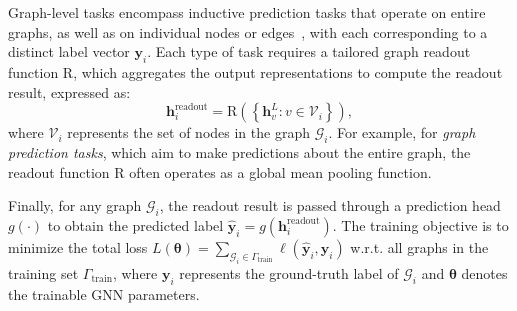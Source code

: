 
Graph-level tasks encompass inductive prediction tasks that operate on entire graphs, as well as on individual nodes or edges~\cite{dwivedi2022long}, with each corresponding to a distinct label vector $\boldsymbol{y}_i$. Each type of task requires a tailored graph readout function $\mathrm{R}$, which aggregates the output representations to compute the readout result, expressed as:
\begin{equation}
\boldsymbol{h}^\text{readout}_i = \mathrm{R}\left( \left\{ \boldsymbol{h}_v^L : v \in \mathcal{V}_i \right\} \right),
\label{readout}
\end{equation}
where $\mathcal{V}_i$ represents the set of nodes in the graph $\mathcal{G}_i$. For example, for \emph{graph prediction tasks}, which aim to make predictions about the entire graph, the readout function $\mathrm{R}$ often operates as a global mean pooling function. 

Finally, for any graph $\mathcal{G}_i$, the readout result is passed through a prediction head \( g(\text{·}) \) to obtain the predicted label \( \hat{\boldsymbol{y}}_i = g(\boldsymbol{h}^\text{readout}_i) \). The training objective is to minimize the total loss \( L(\boldsymbol{\theta}) = \sum_{\mathcal{G}_i \in \Gamma_{\text{train}}} \ell(\hat{\boldsymbol{y}}_i, \boldsymbol{y}_i) \) w.r.t. all graphs in the training set $\Gamma_{\text{train}}$, where \(\boldsymbol{y}_i\) represents the ground-truth label of $\mathcal{G}_i$ and \(\boldsymbol{\theta}\) denotes the trainable GNN parameters. 




